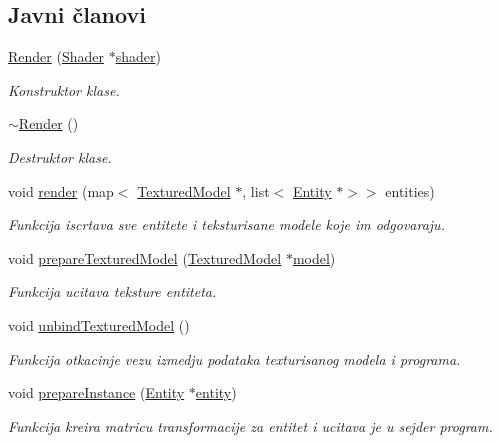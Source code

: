 \subsection*{Javni članovi}
\begin{DoxyCompactItemize}
\item 
\hyperlink{classcore_1_1Render_ab101784fcf9fdb1f8f86b026fd47c2f6}{Render} (\hyperlink{classshader_1_1Shader}{Shader} $\ast$\hyperlink{classcore_1_1Render_a220be4bb26b6cbec909953f247a7732c}{shader})
\begin{DoxyCompactList}\small\item\em Konstruktor klase. \end{DoxyCompactList}\item 
\hyperlink{classcore_1_1Render_ac11786f4406333b24a33b61c5e2506f4}{$\sim$\+Render} ()
\begin{DoxyCompactList}\small\item\em Destruktor klase. \end{DoxyCompactList}\item 
void \hyperlink{classcore_1_1Render_ab36887be4cb2f56e73b10f78e5d04d4a}{render} (map$<$ \hyperlink{classmodel_1_1TexturedModel}{Textured\+Model} $\ast$, list$<$ \hyperlink{classentity_1_1Entity}{Entity} $\ast$$>$$>$ entities)
\begin{DoxyCompactList}\small\item\em Funkcija iscrtava sve entitete i teksturisane modele koje im odgovaraju. \end{DoxyCompactList}\item 
void \hyperlink{classcore_1_1Render_add7058167c0780784695497286c5e382}{prepare\+Textured\+Model} (\hyperlink{classmodel_1_1TexturedModel}{Textured\+Model} $\ast$\hyperlink{namespacecore_aa1479d4ed4dadbfe085b26662122b68a}{model})
\begin{DoxyCompactList}\small\item\em Funkcija ucitava teksture entiteta. \end{DoxyCompactList}\item 
void \hyperlink{classcore_1_1Render_adfa16af79f2e428b94ccbb406e77ef93}{unbind\+Textured\+Model} ()
\begin{DoxyCompactList}\small\item\em Funkcija otkacinje vezu izmedju podataka texturisanog modela i programa. \end{DoxyCompactList}\item 
void \hyperlink{classcore_1_1Render_aeb298077579c71d8b4407dacbed75302}{prepare\+Instance} (\hyperlink{classentity_1_1Entity}{Entity} $\ast$\hyperlink{namespacecore_aa710c0ea388433d2d80d1d1c67582eda}{entity})
\begin{DoxyCompactList}\small\item\em Funkcija kreira matricu transformacije za entitet i ucitava je u sejder program. \end{DoxyCompactList}\end{DoxyCompactItemize}
